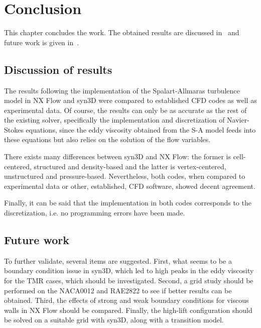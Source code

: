 \chapter{Conclusion}
This chapter concludes the work. The obtained results are discussed in~ and future work is given in~.

\section{Discussion of results}
\label{sec:conclusionresults}
The results following the implementation of the Spalart-Allmaras turbulence model in NX Flow and syn3D were compared to established CFD codes as well as experimental data. Of course, the results can only be as accurate as the rest of the existing solver, specifically the implementation and discretization of Navier-Stokes equations, since the eddy viscosity obtained from the S-A model feeds into these equations but also relies on the solution of the flow variables.

There exists many differences between syn3D and NX Flow: the former is cell-centered, structured and density-based and the latter is vertex-centered, unstructured and pressure-based. Nevertheless, both codes, when compared to experimental data or other, established, CFD software, showed decent agreement.

Finally, it can be said that the implementation in both codes corresponds to the discretization, i.e. no programming errors have been made.

\section{Future work}
\label{sec:future}
To further validate, several items are suggested. First, what seems to be a boundary condition issue in syn3D, which led to high peaks in the eddy viscosity for the TMR cases, which should be investigated. Second, a grid study should be performed on the NACA0012 and RAE2822 to see if better results can be obtained. Third, the effects of strong and weak boundary conditions for viscous walls in NX Flow should be compared. Finally, the high-lift configuration should be solved on a suitable grid with syn3D, along with a transition model.
